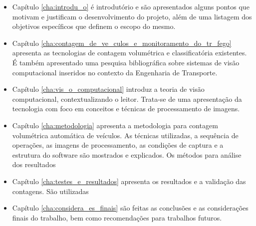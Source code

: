 \begin{itemize}
  \item Capítulo \ref{cha:introdu_o} é introdutório e são apresentados alguns pontos que motivam e justificam o desenvolvimento do projeto, além de uma listagem dos objetivos específicos que definem o escopo do mesmo.
  \item Capítulo \ref{cha:contagem_de_ve_culos_e_monitoramento_do_tr_fego} apresenta as tecnologias de contagem volumétrica e classificatória existentes. É também apresentado uma pesquisa bibliográfica sobre sistemas de visão computacional inseridos no contexto da Engenharia de Transporte.
  \item Capítulo \ref{cha:vis_o_computacional} introduz a teoria de visão computacional, contextualizando o leitor. Trata-se de uma apresentação da tecnologia com foco em conceitos e técnicas de processamento de imagens.
  \item Capítulo \ref{cha:metodologia} apresenta a metodologia para contagem volumétrica automática de veículos. As técnicas utilizadas, a sequência de operações, as imagens de processamento, as condições de captura e a estrutura do software são mostrados e explicados. Os métodos para análise dos resultados 
  \item Capítulo \ref{cha:testes_e_resultados} apresenta os resultados e a validação das contagens. São utilizadas 
  \item Capítulo \ref{cha:considera_es_finais} são feitas as conclusões e as considerações finais do trabalho, bem como recomendações para trabalhos futuros.
\end{itemize}


